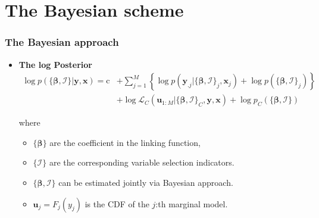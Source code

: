 \documentclass[10pt,aspectratio=169]{beamer}
\begin{document}
\section{The Bayesian scheme}


\begin{frame}%
  \frametitle{The Bayesian approach}
  \begin{itemize}

  \item \textbf{The log Posterior}
    \[
    \begin{split}\log p(\{\bm{\beta},\bm{\mathcal{I}}\}|\bm{y},\bm{x})=
      \mathrm{c}&+\sum\nolimits _{j=1}^{M}\left\{\log
        p(\bm{y}_{.j}|\{\bm{\beta},\bm{\mathcal{I}}\}_{j},\bm{x}_{j}) + \log p(\{\bm{\beta},\bm{\mathcal{I}}\}_j) \right\}\\
      & +\log\mathcal{L}_{C}(\bm{u}_{1:M}|\{\bm{\beta},\bm{\mathcal{I}}\}_{C},\bm{y},\bm{x})+
      \log p_C(\{\bm{\beta},\bm{\mathcal{I}}\})
    \end{split}
    \]

    where
    \begin{itemize}
    \item $\{\bm{\beta}\}$ are the coefficient in the linking function,
    \item $\{\bm{\mathcal{I}}\}$ are the corresponding variable selection indicators.
    \item $\{\bm{\beta},\bm{\mathcal{I}}\}$ can be estimated jointly via Bayesian approach.
    \item $\bm{u}_{j}=F_{j}(y_{j})$ is the CDF of the $j$:th marginal model.
    \end{itemize}


  \end{itemize}
\end{frame}
\end{document}
